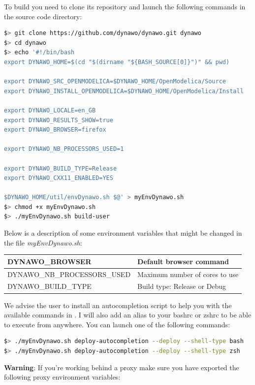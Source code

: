\documentclass[a4paper, 12pt]{report}
\begin{document}
To build \Dynawo you need to clone its repository and launch the following commands in the source code directory:

\begin{lstlisting}[language=bash]
$> git clone https://github.com/dynawo/dynawo.git dynawo
$> cd dynawo
$> echo '#!/bin/bash
export DYNAWO_HOME=$(cd "$(dirname "${BASH_SOURCE[0]}")" && pwd)

export DYNAWO_SRC_OPENMODELICA=$DYNAWO_HOME/OpenModelica/Source
export DYNAWO_INSTALL_OPENMODELICA=$DYNAWO_HOME/OpenModelica/Install

export DYNAWO_LOCALE=en_GB
export DYNAWO_RESULTS_SHOW=true
export DYNAWO_BROWSER=firefox

export DYNAWO_NB_PROCESSORS_USED=1

export DYNAWO_BUILD_TYPE=Release
export DYNAWO_CXX11_ENABLED=YES

$DYNAWO_HOME/util/envDynawo.sh $@' > myEnvDynawo.sh
$> chmod +x myEnvDynawo.sh
$> ./myEnvDynawo.sh build-user
\end{lstlisting}

Below is a description of some environment variables that might be changed in the file \textit{myEnvDynawo.sh}:

\begin{center}
\begin{tabular}{|l|l|}
  \hline
   DYNAWO\_BROWSER & Default browser command \\
  \hline
   DYNAWO\_NB\_PROCESSORS\_USED & Maximum number of cores to use \\
  \hline
   DYNAWO\_BUILD\_TYPE & Build type: Release or Debug \\
  \hline
\end{tabular}
\end{center}

We advise the user to install an autocompletion script to help you with the available commands in \Dynawo. I will also add an alias to your bashrc or zshrc to be able to execute \Dynawo from anywhere. You can launch one of the following commands:
\begin{lstlisting}[language=bash,deletekeywords={help,source}]
$> ./myEnvDynawo.sh deploy-autocompletion --deploy --shell-type bash
$> ./myEnvDynawo.sh deploy-autocompletion --deploy --shell-type zsh
\end{lstlisting}

\textbf{Warning}: If you're working behind a proxy make sure you have exported the following proxy environment variables:
\end{document}
